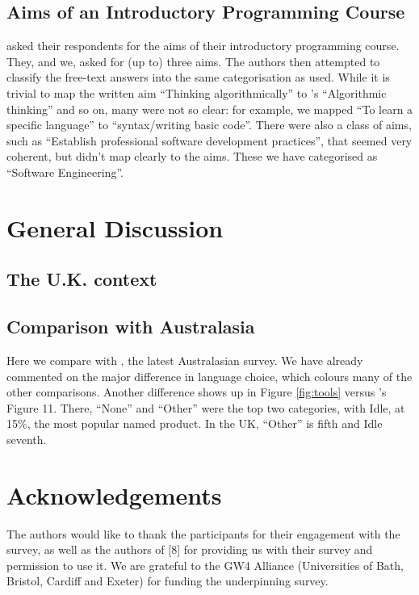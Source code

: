 \documentclass{sig-alternate}
\begin{document}
\subsection{Aims of an Introductory Programming Course}
 \cite{mason+cooper:2014} asked their respondents for the aims of their introductory programming course. They, and we, asked for (up to) three aims. The authors then attempted to classify the free-text answers into the same categorisation as  \cite{mason+cooper:2014} used. While it is trivial to map the written aim ``Thinking algorithmically'' to \cite{mason+cooper:2014}'s ``Algorithmic thinking'' and so on, many were not so clear: for example, we mapped ``To learn a specific language'' to ``syntax/writing basic code''. There were also a class of aims, such as ``Establish professional software development practices'', that seemed very coherent, but didn't map clearly to the \cite{mason+cooper:2014} aims. These we have categorised as ``Software Engineering''.

\section{General Discussion}\label{discussion}

\subsection{The U.K. context}

\subsection{Comparison with Australasia}
Here we compare with \cite{mason+cooper:2014}, the latest Australasian survey. We have already commented on the major difference in language choice,  which colours many of the other comparisons. Another difference shows up in Figure \ref{fig:tools} versus \cite{mason+cooper:2014}'s Figure 11. There, ``None'' and ``Other'' were the top two categories, with Idle, at 15\%, the most popular named product. In the UK, ``Other'' is fifth and Idle seventh.


\section{Acknowledgements}

The authors would like to thank the participants for their engagement
with the survey, as well as the authors of [8] for providing us with their survey and permission to use it.
We are grateful to the GW4 Alliance (Universities of Bath, Bristol, Cardiff and Exeter) for funding the underpinning survey.


\end{document}
